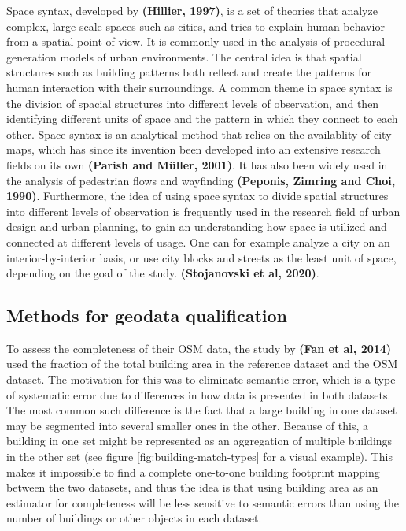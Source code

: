 \documentclass{kththesis}
\begin{document}
Space syntax, developed by \textbf{(Hillier, 1997)}, is a set of theories that analyze complex, large-scale spaces such as cities, and tries to explain human behavior from a spatial point of view.
It is commonly used in the analysis of procedural generation models of urban environments.
The central idea is that spatial structures such as building patterns both reflect and create the patterns for human interaction with their surroundings.
A common theme in space syntax is the division of spacial structures into different levels of observation, and then identifying different units of space and the pattern in which they connect to each other.
Space syntax is an analytical method that relies on the availablity of city maps, which has since its invention been developed into an extensive research fields on its own
\textbf{(Parish and Müller, 2001)}.
It has also been widely used in the analysis of pedestrian flows and wayfinding
\textbf{(Peponis, Zimring and Choi, 1990)}.
Furthermore, the idea of using space syntax to divide spatial structures into different levels of observation is frequently used in the research field of urban design and urban planning, to gain an understanding how space is utilized and connected at different levels of usage.
One can for example analyze a city on an interior-by-interior basis, or use city blocks and streets as the least unit of space, depending on the goal of the study.
\textbf{(Stojanovski et al, 2020)}.

\subsection{Methods for geodata qualification}

To assess the completeness of their OSM data, the study by \textbf{(Fan et al, 2014)} used the fraction of the total building area in the reference dataset and the OSM dataset.
The motivation for this was to eliminate semantic error, which is a type of systematic error due to differences in how data is presented in both datasets.
The most common such difference is the fact that a large building in one dataset may be segmented into several smaller ones in the other.
Because of this, a building in one set might be represented as an aggregation of multiple buildings in the other set (see figure \ref{fig:building-match-types} for a visual example).
This makes it impossible to find a complete one-to-one building footprint mapping between the two datasets, and thus the idea is that using building area as an estimator for completeness will be less sensitive to semantic errors than using the number of buildings or other objects in each dataset.
\end{document}
